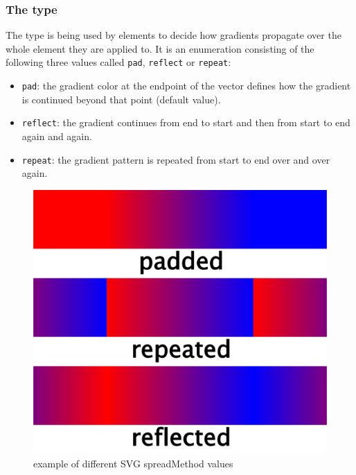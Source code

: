 \subsubsection{The  type}
\label{gradientspreadmethod-type}
The type  is being used by \GradientBase elements to decide how 
gradients propagate over the whole element they are applied to. It is an enumeration consisting 
of the following three values called \texttt{pad}, \texttt{reflect} or \texttt{repeat}:

\begin{itemize}
 \item {\texttt{pad}:} the gradient color at the
endpoint of the vector defines how the gradient is continued beyond that point (default value).
 \item {\texttt{reflect}:} the gradient continues from end to start and
then from start to end again and again.
 \item {\texttt{repeat}:} the gradient pattern is repeated from start to end over and over again.
\end{itemize}

\begin{figure}[!ht]
\begin{center}
\includegraphics[scale=0.18]{figures/SVG_spreadMethod.png}
\end{center}
\caption{example of different SVG spreadMethod values}
\label{SVG:spreadMethod}
\end{figure}

